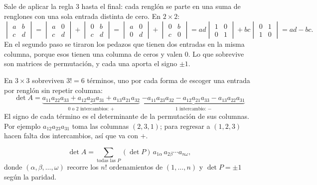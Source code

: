 \documentclass[11pt,letterpaper]{article}
\begin{document}
Sale de aplicar la regla 3 hasta el final: cada renglón se parte en
una suma de renglones con una sola entrada distinta de cero. En
$2 \times 2$:
\[
    \begin{vmatrix} a & b \\ c & d \end{vmatrix}
    = \begin{vmatrix} a & 0 \\ c & d \end{vmatrix}
    + \begin{vmatrix} 0 & b \\ c & d \end{vmatrix}
    = \begin{vmatrix} a & 0 \\ 0 & d \end{vmatrix}
    + \begin{vmatrix} 0 & b \\ c & 0 \end{vmatrix}
    = ad \begin{vmatrix} 1 & 0 \\ 0 & 1 \end{vmatrix}
    + bc \begin{vmatrix} 0 & 1 \\ 1 & 0 \end{vmatrix}
    = ad - bc .
\]
En el segundo paso se tiraron los pedazos que tienen dos entradas en la
misma columna, porque esos tienen una columna de ceros y valen $0$. Lo
que sobrevive son matrices de permutación, y cada una aporta el signo
$\pm 1$.

En $3 \times 3$ sobreviven $3! = 6$ términos, uno por cada forma de
escoger una entrada por renglón sin repetir columna:
\[
    \det A =
    \underbrace{a_{11}a_{22}a_{33} + a_{12}a_{23}a_{31}
                + a_{13}a_{21}a_{32}}_{\text{0 o 2 intercambios: } +}
    \;
    \underbrace{- a_{11}a_{23}a_{32} - a_{12}a_{21}a_{33}
                - a_{13}a_{22}a_{31}}_{\text{1 intercambio: } -}
\]
El signo de cada término es el determinante de la permutación de sus
columnas. Por ejemplo $a_{12}a_{23}a_{31}$ toma las columnas
$(2, 3, 1)$; para regresar a $(1, 2, 3)$ hacen falta dos intercambios,
así que va con $+$.

\begin{definicion}
    \[
        \det A = \sum_{\text{todas las } P} (\det P)\,
        a_{1\alpha}\, a_{2\beta} \cdots a_{n\omega} ,
    \]
    donde $(\alpha, \beta, \ldots, \omega)$ recorre los $n!$
    ordenamientos de $(1, \ldots, n)$ y $\det P = \pm 1$ según la
    paridad.
\end{definicion}
\end{document}
